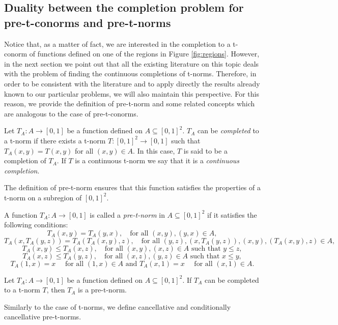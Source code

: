 \subsection{Duality between the completion problem for pre-t-conorms and pre-t-norms}\label{subsec:dualitypretnorms/conorms}
Notice that, as a matter of fact, we are interested in the completion to a t-conorm of functions defined on one of the regions in Figure \ref{fig:regions}. However, in the next section we point out that all the existing literature on this topic deals with the problem of finding the continuous completions of t-norms. Therefore, in order to be consistent with the literature and to apply directly the results already known to our particular problems, we will also maintain this perspective. For this reason, we provide the definition of pre-t-norm and some related concepts which are analogous to the case of pre-t-conorms.
\begin{definition}\label{def:completiont-norm} Let $T_A:A \to [0,1]$ be a function defined on $A \subseteq [0,1]^2$. $T_A$ can be \emph{completed} to a t-norm if there exists a t-norm $T:[0,1]^2 \to [0,1]$ such that $T_A(x,y)=T(x,y)$ for all $(x,y) \in A$. In this case, $T$ is said to be a completion of $T_A$. If $T$ is a continuous t-norm we say that it is a \emph{continuous completion}.
\end{definition}
The definition of pre-t-norm ensures that this function satisfies the properties of a t-norm on a subregion of $[0,1]^2$.
\begin{definition}\label{def:TA} A function $T_A:A \to [0,1]$ is called a \emph{pre-t-norm} in $A \subseteq [0,1]^2$ if it satisfies the following conditions:
	$$T_A(x,y)=T_A(y,x), \quad \text{for all } (x,y), (y,x) \in A,$$
	$$T_A(x,T_A(y,z))=T_A(T_A(x,y),z), \quad \text{for all } (y,z), (x,T_A(y,z)), (x,y), (T_A(x,y),z)\in A,$$
	$$T_A(x,y) \leq T_A(x,z), \quad \text{for all } (x,y),(x,z) \in A \text{ such that } y \leq z,$$
	$$T_A(x,z) \leq T_A(y,z), \quad \text{for all } (x,z),(y,z) \in A \text{ such that } x \leq y,$$
	$$T_A(1,x)=x \quad \text{ for all } (1,x) \in A \text{ and } T_A(x,1)=x \quad \text{ for all } (x,1) \in A.$$
\end{definition}
\begin{proposition}
	Let $T_A:A \to [0,1]$ be a function defined on $A \subseteq [0,1]^2$. If $T_A$ can be completed to a t-norm $T$, then $T_A$ is a pre-t-norm.
\end{proposition}
Similarly to the case of t-norms, we define cancellative and conditionally cancellative pre-t-norms.
